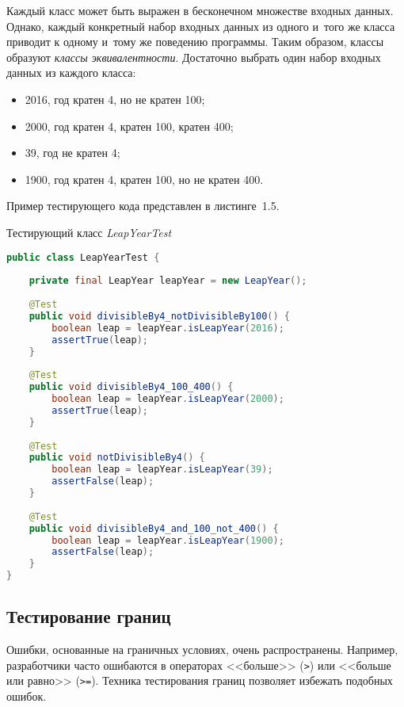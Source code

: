 Каждый класс может быть выражен в бесконечном множестве входных данных. Однако, каждый конкретный набор входных данных из одного и~того же класса приводит к одному и~тому же поведению программы. Таким образом, классы образуют \textit{классы эквивалентности}. Достаточно выбрать один набор входных данных из каждого класса:

 \begin{itemize}
	\item 2016, год кратен 4, но не кратен 100;
	\item 2000, год кратен 4, кратен 100, кратен 400;
	\item 39, год не кратен 4;
	\item 1900, год кратен 4, кратен 100, но не кратен 400.
\end{itemize}

Пример тестирующего кода представлен в листинге~1.5.

\begin{ListingEnv}[!h]%
	\captiondelim{ } %
	\caption{Тестирующий класс \textit{LeapYearTest}}
	\begin{lstlisting}[language={Java}]
public class LeapYearTest {
	
	private final LeapYear leapYear = new LeapYear();
	
	@Test
	public void divisibleBy4_notDivisibleBy100() {
		boolean leap = leapYear.isLeapYear(2016);
		assertTrue(leap);
	}
	
	@Test
	public void divisibleBy4_100_400() {
		boolean leap = leapYear.isLeapYear(2000);
		assertTrue(leap);
	}
	
	@Test
	public void notDivisibleBy4() {
		boolean leap = leapYear.isLeapYear(39);
		assertFalse(leap);
	}
	
	@Test
	public void divisibleBy4_and_100_not_400() {
		boolean leap = leapYear.isLeapYear(1900);
		assertFalse(leap);
	}
}
	\end{lstlisting}
\end{ListingEnv}%



\subsection{Тестирование границ} 
 
Ошибки, основанные на граничных условиях, очень распространены. Например, разработчики часто ошибаются в операторах <<больше>> (\texttt{>}) или <<больше или равно>> (\texttt{>=}). Техника тестирования границ позволяет избежать подобных ошибок.

